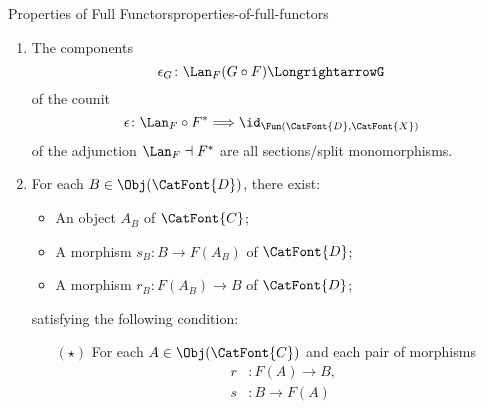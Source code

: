 \begin{proposition}{Properties of Full Functors}{properties-of-full-functors}
\begin{enumerate}
\begin{enumerate}
                    \[
                        \eta_{G}%
                        \colon%
                        G%
                        \Longrightarrow%
                        \Ran_{F}(G\circ F)%
                    \]%
                    of the unit
                    \[
                        \eta%
                        \colon%
                        \id_{\Fun(\CatFont{D},\CatFont{X})}%
                        \Longrightarrow%
                        \Ran_{F}\circ F^{*}%
                    \]%
                    of the adjunction $F^{*}\dashv\Ran_{F}$ are all retractions/split epimorphisms.
                \item\label{properties-of-full-functors-interaction-with-precomposition-4-d}The components
                    \[
                        \epsilon_{G}%
                        \colon%
                        \Lan_{F}(G\circ F)%
                        \Longrightarrow%
                        G%
                    \]%
                    of the counit
                    \[
                        \epsilon%
                        \colon%
                        \Lan_{F}\circ F^{*}%
                        \Longrightarrow%
                        \id_{\Fun(\CatFont{D},\CatFont{X})}%
                    \]%
                    of the adjunction $\Lan_{F}\dashv F^{*}$ are all sections/split monomorphisms.
                \item\label{properties-of-full-functors-interaction-with-precomposition-4-e}For each $B\in\Obj(\CatFont{D})$, there exist:
                    \begin{itemize}%
                        \item An object $A_{B}$ of $\CatFont{C}$;
                        \item A morphism $s_{B}\colon B\to F(A_{B})$ of $\CatFont{D}$;
                        \item A morphism $r_{B}\colon F(A_{B})\to B$ of $\CatFont{D}$;
                    \end{itemize}%
                    satisfying the following condition:
                    \begin{itemize}%
                        \item[$(\star)$]For each $A\in\Obj(\CatFont{C})$ and each pair of morphisms
                            \begin{align*}
                                r &\colon F(A) \to B,\\
                                s &\colon B    \to F(A)

\end{align*}
\end{itemize}
\end{enumerate}
\end{enumerate}
\end{proposition}
